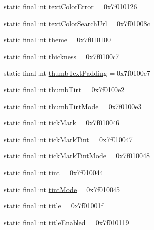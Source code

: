 \begin{CompactItemize}
\item 
static final int \hyperlink{classandroid_1_1support_1_1v7_1_1mediarouter_1_1_r_1_1attr_45dae21a8c73587e2560610569ae229a}{textColorError} = 0x7f010126
\item 
static final int \hyperlink{classandroid_1_1support_1_1v7_1_1mediarouter_1_1_r_1_1attr_52a5eb97fd1cef46c6a1ff8247c17524}{textColorSearchUrl} = 0x7f01008c
\item 
static final int \hyperlink{classandroid_1_1support_1_1v7_1_1mediarouter_1_1_r_1_1attr_37ffb20ae93cb321449beb100899149e}{theme} = 0x7f010100
\item 
static final int \hyperlink{classandroid_1_1support_1_1v7_1_1mediarouter_1_1_r_1_1attr_8cdbf7deff9390ed5d30f503eb97009f}{thickness} = 0x7f0100c7
\item 
static final int \hyperlink{classandroid_1_1support_1_1v7_1_1mediarouter_1_1_r_1_1attr_c85f112b47b206be1db36a15a43bf885}{thumbTextPadding} = 0x7f0100e7
\item 
static final int \hyperlink{classandroid_1_1support_1_1v7_1_1mediarouter_1_1_r_1_1attr_65074c0fda663818e7534f723c9dda29}{thumbTint} = 0x7f0100e2
\item 
static final int \hyperlink{classandroid_1_1support_1_1v7_1_1mediarouter_1_1_r_1_1attr_479369ec52944585c06c87e4d3517134}{thumbTintMode} = 0x7f0100e3
\item 
static final int \hyperlink{classandroid_1_1support_1_1v7_1_1mediarouter_1_1_r_1_1attr_9e252a6c81cbb456328ab02ae9b9e509}{tickMark} = 0x7f010046
\item 
static final int \hyperlink{classandroid_1_1support_1_1v7_1_1mediarouter_1_1_r_1_1attr_5cb4b89b9f897c1321c4d077189f0df3}{tickMarkTint} = 0x7f010047
\item 
static final int \hyperlink{classandroid_1_1support_1_1v7_1_1mediarouter_1_1_r_1_1attr_c797b63ed3d7c4754c117b4a59eedd5b}{tickMarkTintMode} = 0x7f010048
\item 
static final int \hyperlink{classandroid_1_1support_1_1v7_1_1mediarouter_1_1_r_1_1attr_af0dff836cc292c2ed6025c8099bbfa6}{tint} = 0x7f010044
\item 
static final int \hyperlink{classandroid_1_1support_1_1v7_1_1mediarouter_1_1_r_1_1attr_182f9bea6bebdae805bcbb8b1b4145e4}{tintMode} = 0x7f010045
\item 
static final int \hyperlink{classandroid_1_1support_1_1v7_1_1mediarouter_1_1_r_1_1attr_bf9a91722acc2c198831902773aba8e0}{title} = 0x7f01001f
\item 
static final int \hyperlink{classandroid_1_1support_1_1v7_1_1mediarouter_1_1_r_1_1attr_74f4ff2dd78bdf08eac3fd84b0c50178}{titleEnabled} = 0x7f010119

\end{CompactItemize}
